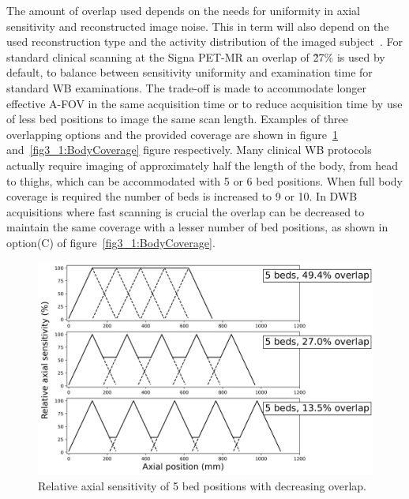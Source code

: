 The amount of overlap used depends on the needs for uniformity in axial sensitivity and reconstructed image noise. This in term will also depend on the used reconstruction type and the activity distribution of the imaged subject~\cite{Schubert1996}. 
For standard clinical scanning at the Signa PET-MR an overlap of \~27\% is used by default, to balance between sensitivity uniformity and examination time for standard WB examinations. The trade-off is made to accommodate longer effective A-FOV in the same acquisition time or to reduce acquisition time by use of less bed positions to image the same scan length. Examples of three overlapping options and the provided coverage are shown in figure~\ref{fig3_1:decreasingOverlap} and~\ref{fig3_1:BodyCoverage} figure respectively.
Many clinical WB protocols actually require imaging of approximately half the length of the body, from head to thighs, which can be accommodated with 5 or 6 bed positions. When full body coverage is required the number of beds is increased to 9 or 10. In DWB acquisitions where fast scanning is crucial the overlap can be decreased to maintain the same coverage with a lesser number of bed positions, as shown in option(C) of figure~\ref{fig3_1:BodyCoverage}. 
%
\begin{figure} [ht!]
\centering
\includegraphics[scale=0.5,angle=0]{3_Results/3_1_DWB_Optimization/figures/SensitivityProfiles_3Options.png}
\caption{Relative axial sensitivity of 5 bed positions with decreasing overlap.} 
\label{fig3_1:decreasingOverlap}
\end{figure}
%
%
